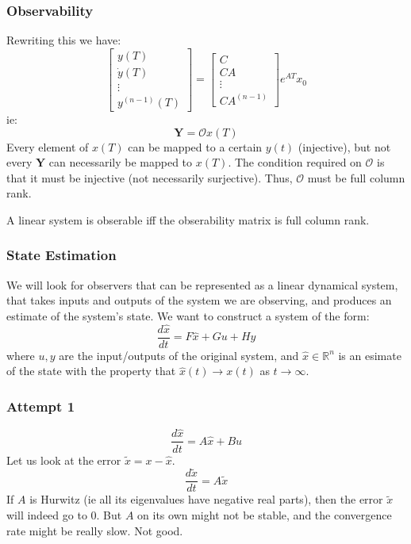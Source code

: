 \documentclass{beamer}
\theoremstyle{definition}
\theoremstyle{remark}
\begin{document}
\begin{frame}
\frametitle{Observability}
Rewriting this we have: 
\begin{equation}
\begin{bmatrix}
    y(T) \\
    \dot{y}(T) \\
    \vdots \\
    y^{(n-1)}(T)
\end{bmatrix}
= 
\begin{bmatrix}
    C \\
    CA \\ 
    \vdots \\
    CA^{(n-1)}
\end{bmatrix}
e^{AT}x_0
\end{equation}
ie: 
\begin{equation}
    \mathbf{Y} = \mathcal{O} x(T)
\end{equation}
Every element of $x(T)$ can be mapped to a certain $y(t)$ (injective), but
not every $\mathbf{Y}$ can necessarily be mapped to $x(T)$. 
The condition required on $\mathcal{O}$ is that it must be injective (not necessarily surjective).
Thus, $\mathcal{O}$ must be full column rank. 
\end{frame}

\begin{frame}
\begin{theorem}
A linear system is obserable iff the obserability matrix is full column rank. 
\end{theorem}
\end{frame}

\begin{frame}
\frametitle{State Estimation}
We will look for observers that can be represented as a linear dynamical system, 
that takes inputs and outputs of the system we are observing, 
and produces an estimate of the system's state. 
We want to construct a system of the form: 
\begin{equation}
    \frac{d\hat{x}}{dt} = F \hat{x} + G u + Hy
\end{equation}
where $u,y$ are the input/outputs of the original system, and $\hat{x} \in \mathbb{R}^n$
is an esimate of the state with the property that $\hat{x}(t) \to x(t)$ as $t \to \infty$. 
\end{frame}

\begin{frame}
\frametitle{Attempt 1}
\begin{equation}
    \frac{d \hat{x}}{dt} = A\hat{x} + B u
\end{equation}
Let us look at the error $\tilde{x} = x - \hat{x}$.
\begin{equation}
    \frac{d\tilde{x}}{dt} = A \tilde{x}
\end{equation}
If $A$ is Hurwitz (ie all its eigenvalues have negative real parts), 
then the error $\tilde{x}$ will indeed go to 0. 
But $A$ on its own might not be stable, and the convergence rate might be really slow. 
Not good. 
\end{frame}
\end{document}
